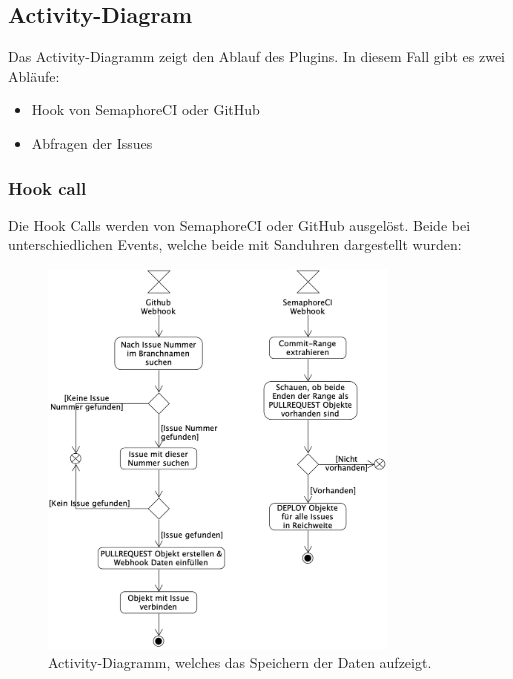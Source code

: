 \subsection{Activity-Diagram}
\label{sec:activity_diagram}
Das Activity-Diagramm zeigt den Ablauf des Plugins. In diesem Fall gibt es zwei Abläufe:
\begin{itemize}
  \item Hook von SemaphoreCI oder GitHub
  \item Abfragen der Issues
\end{itemize}

\subsubsection{Hook call}
Die Hook Calls werden von SemaphoreCI oder GitHub ausgelöst. Beide bei unterschiedlichen Events, welche beide mit Sanduhren
dargestellt wurden:
\begin{figure}[H]
  \centering
  \includegraphics[width=0.8\textwidth]{images/activity/webhook.png}
  \caption[Ein Activity-Diagramm, auf welchem die Verarbeitung der Webhook Daten aufgezeigt wird.]{Activity-Diagramm, welches das Speichern der Daten aufzeigt.}
  \label{fig:activity_hook_call}
\end{figure}

